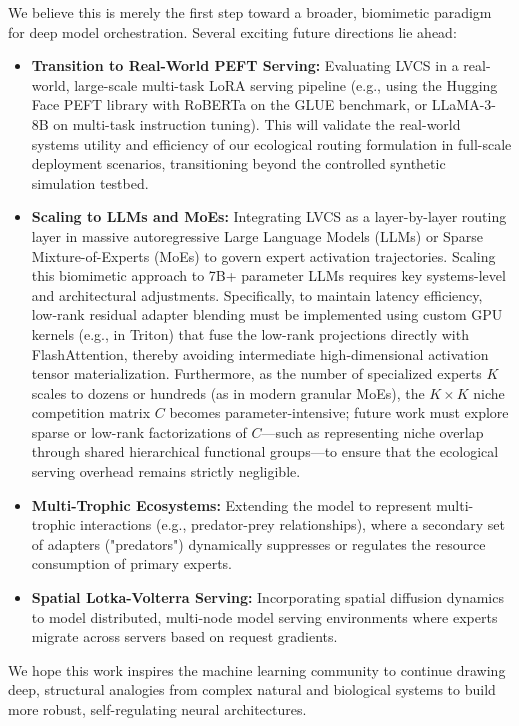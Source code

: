 We believe this is merely the first step toward a broader, biomimetic paradigm for deep model orchestration. Several exciting future directions lie ahead:
\begin{itemize}
    \item \textbf{Transition to Real-World PEFT Serving:} Evaluating LVCS in a real-world, large-scale multi-task LoRA serving pipeline (e.g., using the Hugging Face PEFT library with RoBERTa on the GLUE benchmark, or LLaMA-3-8B on multi-task instruction tuning). This will validate the real-world systems utility and efficiency of our ecological routing formulation in full-scale deployment scenarios, transitioning beyond the controlled synthetic simulation testbed.
    \item \textbf{Scaling to LLMs and MoEs:} Integrating LVCS as a layer-by-layer routing layer in massive autoregressive Large Language Models (LLMs) or Sparse Mixture-of-Experts (MoEs) to govern expert activation trajectories. Scaling this biomimetic approach to 7B+ parameter LLMs requires key systems-level and architectural adjustments. Specifically, to maintain latency efficiency, low-rank residual adapter blending must be implemented using custom GPU kernels (e.g., in Triton) that fuse the low-rank projections directly with FlashAttention, thereby avoiding intermediate high-dimensional activation tensor materialization. Furthermore, as the number of specialized experts $K$ scales to dozens or hundreds (as in modern granular MoEs), the $K \times K$ niche competition matrix $C$ becomes parameter-intensive; future work must explore sparse or low-rank factorizations of $C$—such as representing niche overlap through shared hierarchical functional groups—to ensure that the ecological serving overhead remains strictly negligible.
    \item \textbf{Multi-Trophic Ecosystems:} Extending the model to represent multi-trophic interactions (e.g., predator-prey relationships), where a secondary set of adapters ("predators") dynamically suppresses or regulates the resource consumption of primary experts.
    \item \textbf{Spatial Lotka-Volterra Serving:} Incorporating spatial diffusion dynamics to model distributed, multi-node model serving environments where experts migrate across servers based on request gradients.
\end{itemize}
We hope this work inspires the machine learning community to continue drawing deep, structural analogies from complex natural and biological systems to build more robust, self-regulating neural architectures.

